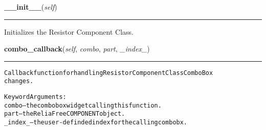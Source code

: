     \label{reliafree:resistors:resistor:Resistor:__init__}

    \vspace{0.5ex}

\hspace{.8\funcindent}\begin{boxedminipage}{\funcwidth}

    \raggedright \textbf{\_\_init\_\_}(\textit{self})

    \vspace{-1.5ex}

    \rule{\textwidth}{0.5\fboxrule}
\setlength{\parskip}{2ex}
    Initializes the Resistor Component Class.

\setlength{\parskip}{1ex}
    \end{boxedminipage}

    \label{reliafree:resistors:resistor:Resistor:combo_callback}

    \vspace{0.5ex}

\hspace{.8\funcindent}\begin{boxedminipage}{\funcwidth}

    \raggedright \textbf{combo\_callback}(\textit{self}, \textit{combo}, \textit{part}, \textit{\_index\_})

    \vspace{-1.5ex}

    \rule{\textwidth}{0.5\fboxrule}
\setlength{\parskip}{2ex}
\begin{alltt}
Callback function for handling Resistor Component Class ComboBox
changes.

Keyword Arguments:
  combo -- the combobox widget calling this function.
   part -- the ReliaFree COMPONENT object.
\_index\_ -- the user-definded index for the calling combobx.
\end{alltt}

\setlength{\parskip}{1ex}
    \end{boxedminipage}

